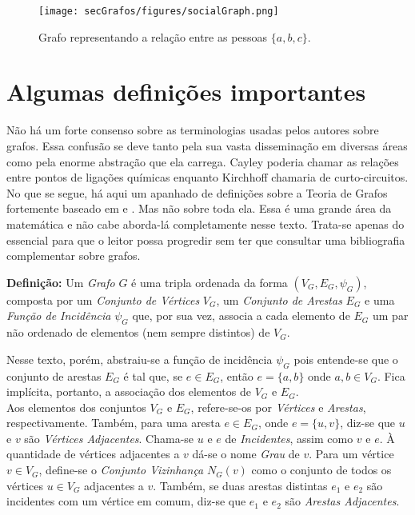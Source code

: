 \begin{figure}[H]
	\begin{center}
		\texttt{[image: secGrafos/figures/socialGraph.png]}
	\end{center}
	\caption{Grafo representando a relação entre as pessoas $\{a, b, c\}$.}
	\label{fig:socialGraph}
\end{figure}

\section{Algumas definições importantes}

Não há um forte consenso sobre as terminologias usadas pelos autores sobre grafos. Essa confusão se deve tanto pela sua vasta disseminação em diversas áreas como pela enorme abstração que ela carrega. Cayley poderia chamar as relações entre pontos de ligações químicas enquanto Kirchhoff chamaria de curto-circuitos.
No que se segue, há aqui um apanhado de definições sobre a Teoria de Grafos fortemente baseado em \cite{graphTheoryFHarary} e \cite{graphTheoryApplicationsBondy}. Mas não sobre toda ela. Essa é uma grande área da matemática e não cabe aborda-lá completamente nesse texto. Trata-se apenas do essencial para que o leitor possa progredir sem ter que consultar uma bibliografia complementar sobre grafos.

\begin{center}
	\begin{minipage}{0.9 \linewidth}
		\textbf{Definição:} Um \textit{Grafo} $G$ é uma tripla ordenada da forma $(V_G,E_G, \psi_{G})$, composta por um \textit{Conjunto de Vértices} $V_G$, um \textit{Conjunto de Arestas} $E_G$ e uma \textit{Função de Incidência} $\psi_{G}$ que, por sua vez, associa a cada elemento de $E_G$ um par não ordenado de elementos (nem sempre distintos) de $V_G$.
	\end{minipage}
\end{center} 

Nesse texto, porém, abstraiu-se a função de incidência $\psi_G$ pois entende-se que o conjunto de arestas $E_G$ é tal que, se $e \in E_G$, então $e = \{a, b\}$ onde $a, b \in V_G$. Fica implícita, portanto, a associação dos elementos de  $V_G$ e $E_G$.
\\

Aos elementos dos conjuntos $V_G$ e $E_G$, refere-se-os por \textit{Vértices} e \textit{Arestas}, respectivamente. Também, para uma aresta $e \in E_G$, onde $e = \{u, v\}$, diz-se que $u$ e $v$ são \textit{Vértices Adjacentes}. Chama-se $u$ e $e$ de \textit{Incidentes}, assim como $v$ e $e$. À quantidade de vértices adjacentes a $v$ dá-se o nome \textit{Grau} de $v$. Para um vértice $v\in V_G$, define-se o \textit{Conjunto Vizinhança} $N_G(v)$ como o conjunto de todos os vértices $u\in V_G$ adjacentes a $v$. Também, se duas arestas distintas $e_1$ e $e_2$ são incidentes com um vértice em comum, diz-se que $e_1$ e $e_2$ são \textit{Arestas Adjacentes}. 
\\


